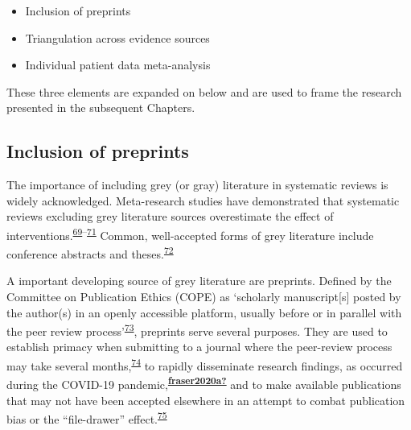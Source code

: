 \documentclass[a4paper, twoside]{templates/ociamthesis}
\providecommand{\tightlist}{%
  \setlength{\itemsep}{0pt}\setlength{\parskip}{0pt}}
\begin{document}
\begin{itemize}
\tightlist
\item
  Inclusion of preprints
\item
  Triangulation across evidence sources
\item
  Individual patient data meta-analysis
\end{itemize}

These three elements are expanded on below and are used to frame the research presented in the subsequent Chapters.

\hypertarget{diverse-sources-preprints}{%
\subsection{Inclusion of preprints}\label{diverse-sources-preprints}}

The importance of including grey (or gray) literature in systematic reviews is widely acknowledged. Meta-research studies have demonstrated that systematic reviews excluding grey literature sources overestimate the effect of interventions.\textsuperscript{\protect\hyperlink{ref-conn2003}{69}--\protect\hyperlink{ref-hopewell2007}{71}} Common, well-accepted forms of grey literature include conference abstracts and theses.\textsuperscript{\protect\hyperlink{ref-lefebvre2019searching}{72}}

A important developing source of grey literature are preprints. Defined by the Committee on Publication Ethics (COPE) as `scholarly manuscript{[}s{]} posted by the author(s) in an openly accessible platform, usually before or in parallel with the peer review process'\textsuperscript{\protect\hyperlink{ref-committeeonpublicationethicscope2018}{73}}, preprints serve several purposes. They are used to establish primacy when submitting to a journal where the peer-review process may take several months,\textsuperscript{\protect\hyperlink{ref-vale2016}{74}} to rapidly disseminate research findings, as occurred during the COVID-19 pandemic,\textsuperscript{\protect\hyperlink{ref-fraser2020a}{\textbf{fraser2020a?}}} and to make available publications that may not have been accepted elsewhere in an attempt to combat publication bias or the ``file-drawer'' effect.\textsuperscript{\protect\hyperlink{ref-rosenthal1979}{75}}
\end{document}
